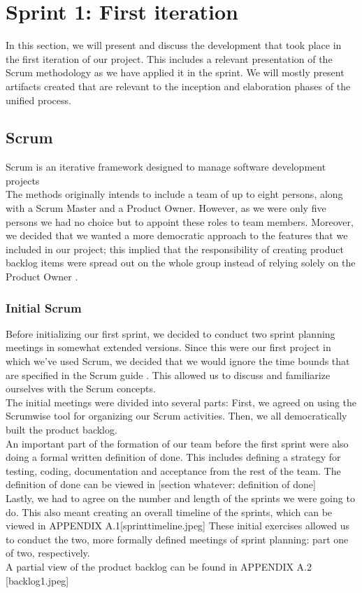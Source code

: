 \section{Sprint 1: First iteration}
In this section, we will present and discuss the development that took place in the first iteration of our project. This includes a relevant presentation of the Scrum methodology as we have applied it in the sprint. We will mostly present artifacts created that are relevant to the inception and elaboration phases of the unified process.
\subsection{Scrum}
Scrum is an iterative framework designed to manage software development projects \cite{scrumguide} \\
The methods originally intends to include a team of up to eight persons, along with a Scrum Master and a Product Owner. However, as we were only five persons we had no choice but to appoint these roles to team members. Moreover, we decided that we wanted a more democratic approach to the features that we included in our project; this implied that the responsibility of creating product backlog items were spread out on the whole group instead of relying solely on the Product Owner \cite[p.~12]{scrumguide}.
\subsubsection{Initial Scrum}
Before initializing our first sprint, we decided to conduct two sprint planning meetings in somewhat extended versions. Since this were our first project in which we’ve used Scrum, we decided that we would ignore the time bounds that are specified in the Scrum guide \cite[p.~9]{scrumguide}. This allowed us to discuss and familiarize ourselves with the Scrum concepts.\\
The initial meetings were divided into several parts: First, we agreed on using the Scrumwise \cite{scrumwise} tool for organizing our Scrum activities. Then, we all democratically built the product backlog. \\
An important part of the formation of our team before the first sprint were also doing a formal written definition of done. This includes defining a strategy for testing, coding, documentation and acceptance from the rest of the team. The definition of done can be viewed in [section whatever: definition of done]\\
Lastly, we had to agree on the number and length of the sprints we were going to do. This also meant creating an overall timeline of the sprints, which can be viewed in APPENDIX A.1[sprinttimeline.jpeg]  These initial exercises allowed us to conduct the two, more formally defined meetings of sprint planning: part one of two, respectively. \\
A partial view of the product backlog can be found in APPENDIX A.2 [backlog1.jpeg]\\
